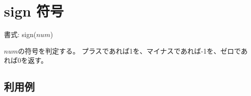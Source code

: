 
%

\section{sign 符号\label{sect:sign}}

書式: sign($num$)

$num$の符号を判定する。
プラスであれば1を、マイナスであれば-1を、ゼロであれば0を返す。

\subsection*{利用例}


%

